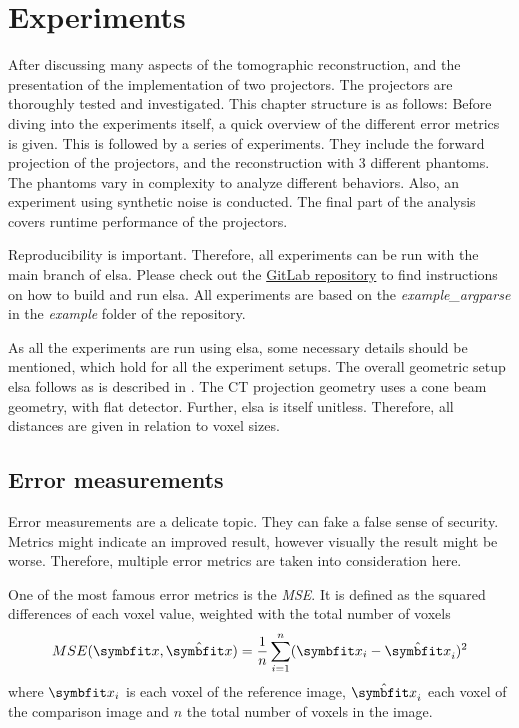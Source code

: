 \chapter{Experiments}\label{chap:experiments}

After discussing many aspects of the tomographic reconstruction, and the presentation of the
implementation of two projectors. The projectors are thoroughly tested and investigated. This
chapter structure is as follows: Before diving into the experiments itself, a quick overview of the
different error metrics is given. This is followed by a series of experiments. They include the
forward projection of the projectors, and the reconstruction with 3 different phantoms. The phantoms
vary in complexity to analyze different behaviors. Also, an experiment using synthetic noise is
conducted. The final part of the analysis covers runtime performance of the projectors.

Reproducibility is important. Therefore, all experiments can be run with the main branch of
elsa. Please check out the \href{https://gitlab.lrz.de/IP/elsa}{GitLab repository} to find
instructions on how to build and run elsa. All experiments are based on the
\textit{example\_argparse} in the \textit{example} folder of the repository.

As all the experiments are run using elsa, some necessary details should be mentioned, which hold
for all the experiment setups. The overall geometric setup elsa follows as is described in
\textcite{hartley_multiple_2003}. The CT projection geometry uses a cone beam geometry, with flat
detector. Further, elsa is itself unitless. Therefore, all distances are given in relation to voxel
sizes.

\section{Error measurements}\label{sec:error_measurements}

Error measurements are a delicate topic. They can fake a false sense of security. Metrics might
indicate an improved result, however visually the result might be worse. Therefore, multiple error
metrics are taken into consideration here.

\begin{definition}
	One of the most famous error metrics is the \textit{\gls{MSE}}. It is defined as the
	squared differences of each voxel value, weighted with the total number of voxels
	\[ MSE(\mvec{x}, \hat{\mvec{x}}) = \frac{1}{n} \sum_{i=1}^{n}(\mvec{x}_i - \hat{\mvec{x}}_i)^2\]
	where \(\mvec{x}_i\) is each voxel of the reference image, \(\hat{\mvec{x}}_i\) each voxel
	of the comparison image and \(n\) the total number of voxels in the image.
\end{definition}

